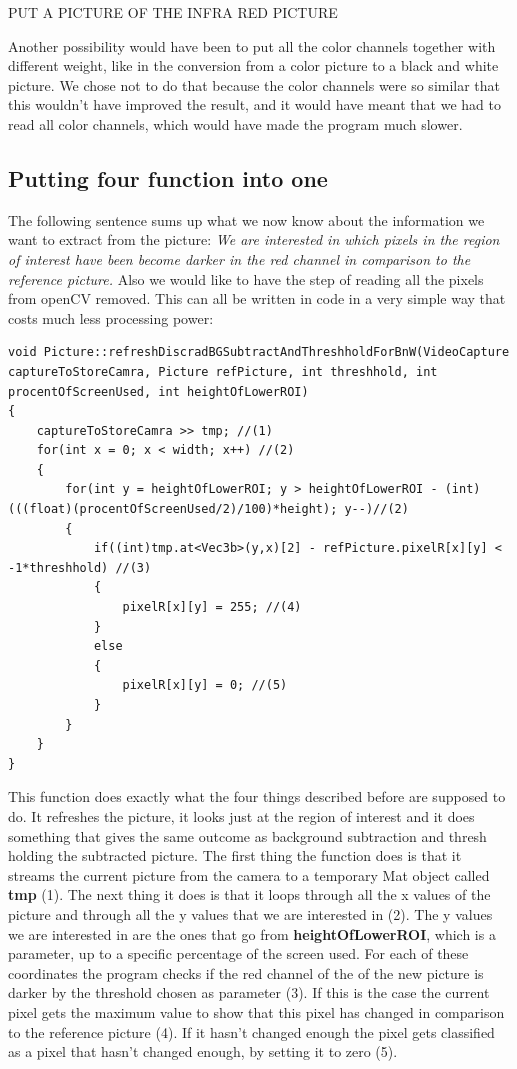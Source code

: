 PUT A PICTURE OF THE INFRA RED PICTURE

Another possibility would have been to put all the color channels together with different weight, like in the conversion from a color picture to a black and white picture. We chose not to do that because the color channels were so similar that this wouldn't have improved the result, and it would have meant that we had to read all color channels, which would have made the program much slower. 

\subsection{Putting four function into one}
The following sentence sums up what we now  know about the information we want to extract from the picture: \textit{We are interested in which pixels in the region of interest have been become darker in the red channel in comparison to the reference picture.} 
Also we would like to have the step of reading all the pixels from openCV removed. This can all be written in code in a very simple way that costs much less processing power:

\begin{lstlisting}
void Picture::refreshDiscradBGSubtractAndThreshholdForBnW(VideoCapture captureToStoreCamra, Picture refPicture, int threshhold, int procentOfScreenUsed, int heightOfLowerROI)
{
	captureToStoreCamra >> tmp; //(1)
	for(int x = 0; x < width; x++) //(2)
	{
		for(int y = heightOfLowerROI; y > heightOfLowerROI - (int)(((float)(procentOfScreenUsed/2)/100)*height); y--)//(2)
		{
			if((int)tmp.at<Vec3b>(y,x)[2] - refPicture.pixelR[x][y] < -1*threshhold) //(3)
			{
				pixelR[x][y] = 255; //(4)
			}
			else
			{
				pixelR[x][y] = 0; //(5)
			}
		}
	}
}
\end{lstlisting}
This function does exactly what the four things described before are supposed to do. It refreshes the picture, it looks just at the region of interest and it does something that gives the same outcome as background subtraction and thresh holding the subtracted picture.
The first thing the function does is that it streams the current picture from the camera to a temporary Mat object called \textbf{tmp} (1). The next thing it does is that it loops through all the x values of the picture and through all the y values that we are interested in (2). The y values we are interested in are the ones that go from \textbf{heightOfLowerROI}, which is a parameter, up to a specific percentage of the screen used. For each of these coordinates the program checks if the red channel of the of the new picture is darker by the threshold chosen as parameter (3). If this is the case the current pixel gets the maximum value to show that this pixel has changed in comparison to the reference picture (4). If it hasn't changed enough the pixel gets classified as a pixel that hasn't changed enough, by setting it to zero (5).

